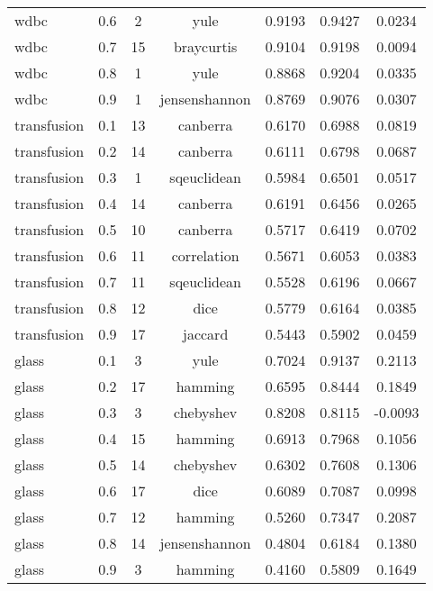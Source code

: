 \begin{table}[ht]
\begin{tabular}{lcccccc}
wdbc & 0.6 & 2 & yule & 0.9193 & 0.9427 & 0.0234 \\
wdbc & 0.7 & 15 & braycurtis & 0.9104 & 0.9198 & 0.0094 \\
wdbc & 0.8 & 1 & yule & 0.8868 & 0.9204 & 0.0335 \\
wdbc & 0.9 & 1 & jensenshannon & 0.8769 & 0.9076 & 0.0307 \\
transfusion & 0.1 & 13 & canberra & 0.6170 & 0.6988 & 0.0819 \\
transfusion & 0.2 & 14 & canberra & 0.6111 & 0.6798 & 0.0687 \\
transfusion & 0.3 & 1 & sqeuclidean & 0.5984 & 0.6501 & 0.0517 \\
transfusion & 0.4 & 14 & canberra & 0.6191 & 0.6456 & 0.0265 \\
transfusion & 0.5 & 10 & canberra & 0.5717 & 0.6419 & 0.0702 \\
transfusion & 0.6 & 11 & correlation & 0.5671 & 0.6053 & 0.0383 \\
transfusion & 0.7 & 11 & sqeuclidean & 0.5528 & 0.6196 & 0.0667 \\
transfusion & 0.8 & 12 & dice & 0.5779 & 0.6164 & 0.0385 \\
transfusion & 0.9 & 17 & jaccard & 0.5443 & 0.5902 & 0.0459 \\
glass & 0.1 & 3 & yule & 0.7024 & 0.9137 & 0.2113 \\
glass & 0.2 & 17 & hamming & 0.6595 & 0.8444 & 0.1849 \\
glass & 0.3 & 3 & chebyshev & 0.8208 & 0.8115 & -0.0093 \\
glass & 0.4 & 15 & hamming & 0.6913 & 0.7968 & 0.1056 \\
glass & 0.5 & 14 & chebyshev & 0.6302 & 0.7608 & 0.1306 \\
glass & 0.6 & 17 & dice & 0.6089 & 0.7087 & 0.0998 \\
glass & 0.7 & 12 & hamming & 0.5260 & 0.7347 & 0.2087 \\
glass & 0.8 & 14 & jensenshannon & 0.4804 & 0.6184 & 0.1380 \\
glass & 0.9 & 3 & hamming & 0.4160 & 0.5809 & 0.1649 \\
\hline
\end{tabular}
\end{table}